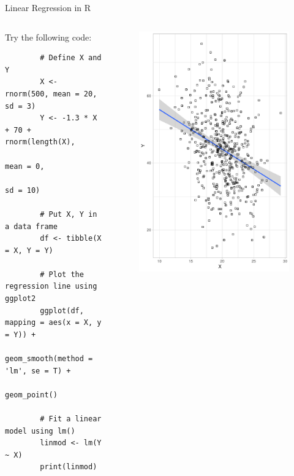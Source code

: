\begin{frame}[fragile]{Linear Regression in R}

    \begin{columns}
    \begin{column}{0.5\textwidth}
        Try the following code:
        {\tiny\begin{verbatim}
        # Define X and Y
        X <- rnorm(500, mean = 20, sd = 3)
        Y <- -1.3 * X + 70 + rnorm(length(X),
                                   mean = 0,
                                   sd = 10)
        
        # Put X, Y in a data frame
        df <- tibble(X = X, Y = Y)
        
        # Plot the regression line using ggplot2
        ggplot(df, mapping = aes(x = X, y = Y)) +
            geom_smooth(method = 'lm', se = T) +
            geom_point()
            
        # Fit a linear model using lm()
        linmod <- lm(Y ~ X)    
        print(linmod)
        \end{verbatim}}
    \end{column}
    \begin{column}{0.5\textwidth}
        \begin{figure}
            \includegraphics[width=0.8\linewidth]{R/plots/linear_regression_example}
        \end{figure}
    \end{column}
    \end{columns}

\end{frame}

